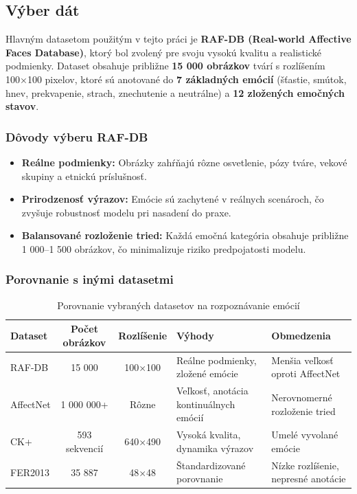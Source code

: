 \subsection{Výber dát}
Hlavným datasetom použitým v tejto práci je \textbf{RAF-DB (Real-world Affective Faces Database)}, ktorý bol zvolený pre svoju vysokú kvalitu a realistické podmienky. Dataset obsahuje približne \textbf{15 000 obrázkov} tvárí s rozlíšením 100×100 pixelov, ktoré sú anotované do \textbf{7 základných emócií} (šťastie, smútok, hnev, prekvapenie, strach, znechutenie a neutrálne) a \textbf{12 zložených emočných stavov}. 

\subsubsection{Dôvody výberu RAF-DB}
\begin{itemize}
    \item \textbf{Reálne podmienky:} Obrázky zahŕňajú rôzne osvetlenie, pózy tváre, vekové skupiny a etnickú príslušnosť.
    \item \textbf{Prirodzenosť výrazov:} Emócie sú zachytené v reálnych scenároch, čo zvyšuje robustnosť modelu pri nasadení do praxe.
    \item \textbf{Balansované rozloženie tried:} Každá emočná kategória obsahuje približne 1 000–1 500 obrázkov, čo minimalizuje riziko predpojatosti modelu.
\end{itemize}

\subsubsection{Porovnanie s inými datasetmi}

\begin{table}[H]
    \centering
    \begin{tabularx}{\textwidth}{|l|c|c|X|X|}
        \hline
        \textbf{Dataset} & \textbf{Počet obrázkov} & \textbf{Rozlíšenie} & \textbf{Výhody} & \textbf{Obmedzenia} \\ \hline
        RAF-DB          & 15 000                  & 100×100            & Reálne podmienky, zložené emócie    & Menšia veľkosť oproti AffectNet \\ \hline
        AffectNet       & 1 000 000+              & Rôzne              & Veľkosť, anotácia kontinuálnych emócií & Nerovnomerné rozloženie tried \\ \hline
        CK+             & 593 sekvencií           & 640×490            & Vysoká kvalita, dynamika výrazov    & Umelé vyvolané emócie \\ \hline
        FER2013         & 35 887                  & 48×48              & Štandardizované porovnanie          & Nízke rozlíšenie, nepresné anotácie \\ \hline
    \end{tabularx}
    \caption{Porovnanie vybraných datasetov na rozpoznávanie emócií}
\end{table}
